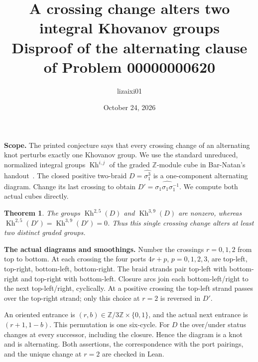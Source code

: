 \documentclass[10pt]{article}
\title{A crossing change alters two integral Khovanov groups\\\large Disproof of the alternating clause of Problem 00000000620}
\author{lizaixi01}
\date{October 24, 2026}
\newcommand{\Z}{\mathbb Z}
\newcommand{\Kh}{\operatorname{Kh}}
\newtheorem{theorem}{Theorem}
\begin{document}
\maketitle
\vspace{-1.5em}

\textbf{Scope.} The printed conjecture says that every crossing change of an alternating
knot perturbs exactly one Khovanov group. We use the standard unreduced,
normalized integral groups $\Kh^{i,j}$ of the graded $\Z$-module cube in
Bar-Natan's handout~\cite{BN}. The closed positive two-braid $D=\widehat{\sigma_1^3}$
is a one-component alternating diagram. Change its last crossing to obtain
$D'=\widehat{\sigma_1\sigma_1\sigma_1^{-1}}$. We compute both actual cubes directly.
\begin{theorem}
The groups $\Kh^{2,5}(D)$ and $\Kh^{3,9}(D)$ are nonzero, whereas
$\Kh^{2,5}(D')=\Kh^{3,9}(D')=0$. Thus this single crossing change alters at least
two distinct graded groups.
\end{theorem}

\textbf{The actual diagrams and smoothings.}
Number the crossings $r=0,1,2$ from top to bottom. At each crossing the four
ports $4r+p$, $p=0,1,2,3$, are top-left, top-right, bottom-left, bottom-right.
The braid strands pair top-left with bottom-right and top-right with bottom-left.
Closure arcs join each bottom-left/right to the next top-left/right, cyclically.
At a positive crossing the top-left strand passes over the top-right strand;
only this choice at $r=2$ is reversed in $D'$.

An oriented entrance is $(r,b)\in\Z/3\Z\times\{0,1\}$, and the actual next entrance
is $(r+1,1-b)$. This permutation is one six-cycle. For $D$ the over/under
status changes at every successor, including the closure. Hence the diagram is
a knot and is alternating. Both assertions, the correspondence with the port
pairings, and the unique change at $r=2$ are checked in Lean.
\end{document}
